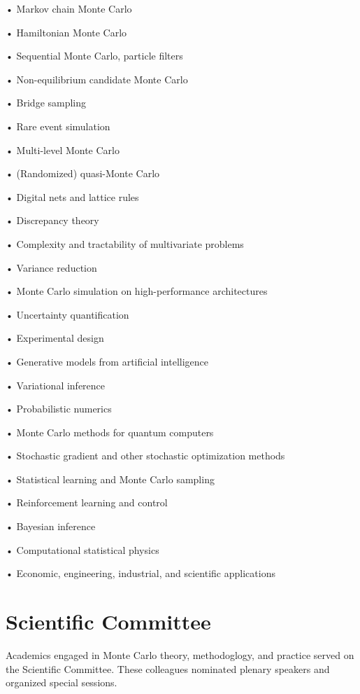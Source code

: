 \setlength{\columnsep}{1cm}
\begin{multicols}{2}
	\raggedright
	• Markov chain Monte Carlo

	• Hamiltonian Monte Carlo

	• Sequential Monte Carlo, particle filters

	• Non-equilibrium candidate Monte Carlo

	• Bridge sampling

	• Rare event simulation

	• Multi-level Monte Carlo

	• (Randomized) quasi-Monte Carlo

	• Digital nets and lattice rules

	• Discrepancy theory

	• Complexity and tractability of multivariate problems

	• Variance reduction

	• Monte Carlo simulation on high-performance architectures

	• Uncertainty quantification

	• Experimental design

	• Generative models from artificial intelligence

	• Variational inference

	• Probabilistic numerics

	• Monte Carlo methods for quantum computers

	• Stochastic gradient and other stochastic optimization methods

	• Statistical learning and Monte Carlo sampling

	• Reinforcement learning and control

	• Bayesian inference

	• Computational statistical physics

	• Economic, engineering, industrial, and scientific applications

\end{multicols}






\section{Scientific Committee}

Academics engaged in Monte Carlo theory, methodoglogy, and practice served on the Scientific Committee.  These colleagues nominated plenary speakers and organized special sessions.


